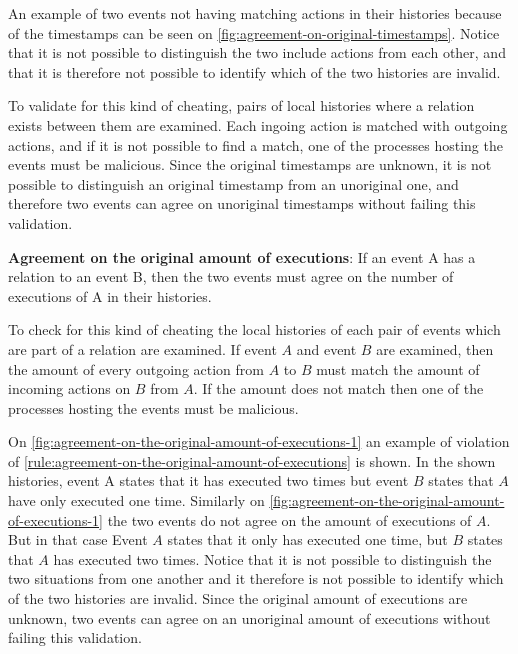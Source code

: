 	\noindent An example of two events not having matching actions in their histories because of the timestamps can be seen on \autoref{fig:agreement-on-original-timestamps}. Notice that it is not possible to distinguish the two include actions from each other, and that it is therefore not possible to identify which of the two histories are invalid.
	
	\newpar To validate for this kind of cheating, pairs of local histories where a relation exists between them are examined. Each ingoing action is matched with outgoing actions, and if it is not possible to find a match, one of the processes hosting the events must be malicious. Since the original timestamps are unknown, it is not possible to distinguish an original timestamp from an unoriginal one, and therefore two events can agree on unoriginal timestamps without failing this validation.
	
	\begin{ruledef}
		\textbf{Agreement on the original amount of executions}: If an event A has a relation to an event B, then the two events must agree on the number of executions of A in their histories.%
		\label{rule:agreement-on-the-original-amount-of-executions}
	\end{ruledef}
	
	\noindent To check for this kind of cheating the local histories of each pair of events which are part of a relation are examined. If event $A$ and event $B$ are examined, then the amount of every outgoing action from $A$ to $B$ must match the amount of incoming actions on $B$ from $A$. If the amount does not match then one of the processes hosting the events must be malicious.
	
	\newpar On \autoref{fig:agreement-on-the-original-amount-of-executions-1} an example of violation of \autoref{rule:agreement-on-the-original-amount-of-executions} is shown. In the shown histories, event A states that it has executed two times but event $B$ states that $A$ have only executed one time. Similarly on \autoref{fig:agreement-on-the-original-amount-of-executions-1} the two events do not agree on the amount of executions of $A$. But in that case Event $A$ states that it only has executed one time, but $B$ states that $A$ has executed two times. Notice that it is not possible to distinguish the two situations from one another and it therefore is not possible to identify which of the two histories are invalid. Since the original amount of executions are unknown, two events can agree on an unoriginal amount of executions without failing this validation. 
	
